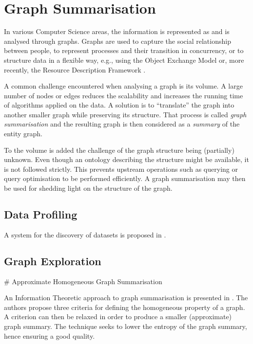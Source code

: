 \chapter{Graph Summarisation}
\label{chap:summary}

In various Computer Science areas, the information is represented as and is analysed through graphs. Graphs are used to capture the social relationship between people, to represent processes and their transition in concurrency, or to structure data in a flexible way, e.g., using the Object Exchange Model \cite{papakonstantinou:1995:oea} or, more recently, the Resource Description Framework \cite{rdfconcepts}.

A common challenge encountered when analysing a graph is its volume. A large number of nodes or edges reduces the scalability and increases the running time of algorithms applied on the data. A solution is to ``translate'' the graph into another smaller graph while preserving its structure. That process is called \emph{graph summarisation} and the resulting graph is then considered as a \emph{summary} of the entity graph.

To the volume is added the challenge of the graph structure being (partially) unknown. Even though an ontology describing the structure might be available, it is not followed strictly. This prevents upstream operations such as querying or query optimisation to be performed efficiently. A graph summarisation may then be used for shedding light on the structure of the graph.

\section{Data Profiling}

A system for the discovery of datasets is proposed in \cite{khatchadourian:2010:eswc}.

\section{Graph Exploration}

\# Approximate Homogeneous Graph Summarisation

An Information Theoretic approach to graph summarisation is presented in \cite{zheng:ipsj:2011}. The authors propose three criteria for defining the homogeneous property of a graph. A criterion can then be relaxed in order to produce a smaller (approximate) graph summary. The technique seeks to lower the entropy of the graph summary, hence ensuring a good quality.

